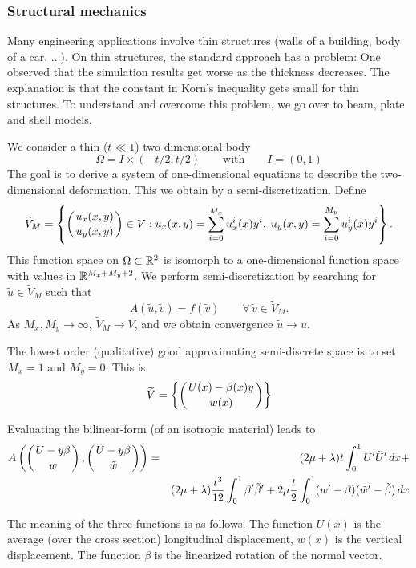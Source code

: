 \subsubsection{Structural mechanics}
Many engineering applications involve thin structures (walls of a building, body of a car, ...).
On thin structures, the standard approach has a problem: One observed that the simulation
results get worse as the thickness decreases. The explanation is that the constant in 
Korn's inequality gets small for thin structures. To understand and overcome this problem,
we go over to beam, plate and shell models. 

\bigskip

We consider a thin ($t \ll 1$) two-dimensional body
$$
\Omega = I \times (-t/2, t/2) \qquad \mbox{with} \qquad I = (0,1)
$$
The goal is to derive a system of one-dimensional equations to describe the two-dimensional
deformation. This we obtain by a semi-discretization. Define
$$
\widetilde V_M = \left\{ \left(u_x(x,y) \atop u_y(x,y) \right) \in V :
 u_x(x,y) = \sum_{i=0}^{M_x} u_x^i(x) y^i , \; u_y(x,y) = \sum_{i=0}^{M_y} u_y^i(x) y^i \right\}.
$$
This function space on $\Omega \subset {\mathbb R}^2$ is isomorph to a one-dimensional 
function space with values in ${\mathbb R}^{M_x+M_y+2}$. We perform semi-discretization 
by searching for
$\tilde u \in \widetilde V_M$ such that
$$
A(\tilde u, \tilde v) = f(\tilde v) \qquad \forall \, \tilde v \in \widetilde V_M.
$$
As $M_x, M_y \rightarrow \infty$, $\widetilde V_M \rightarrow V$, and 
we obtain convergence $\tilde u \rightarrow u$. 

\bigskip
The lowest order (qualitative) good approximating semi-discrete space is to set
$M_x = 1$ and $M_y = 0$. This is
$$
\widetilde V = \left\{ \left( U(x) - \beta(x) y  \atop w(x) \right) \right\}
$$

Evaluating the bilinear-form (of an isotropic material) leads to 
\begin{eqnarray*}
  A\left( \left( U - y \beta \atop w \right), \left( \tilde U - y \tilde \beta \atop \tilde w \right) \right) & = & 
  (2 \mu + \lambda) t \int_0^1 U^\prime \tilde U^\prime \, dx + \\
&&  (2 \mu + \lambda) \frac{t^3}{12} \int_0^1 \beta^\prime \tilde \beta^\prime + 
  2 \mu \frac{t}{2} \int_0^1 (w^\prime - \beta) (\tilde w^\prime - \tilde \beta) \, dx
\end{eqnarray*}


The meaning of the three functions is as follows. The function $U(x)$ is the average 
(over the cross section) longitudinal displacement, $w(x)$ is the vertical displacement.
The function $\beta$ is the linearized rotation of the normal vector.

